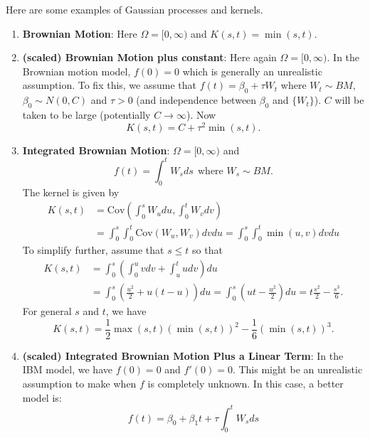 \documentclass{scrartcl}
\begin{document}
Here are some examples of Gaussian processes and kernels.
\begin{enumerate}
\item \textbf{Brownian Motion}: Here $\Omega = [0, \infty)$ and $K(s,
  t) = \min(s, t)$.
\item \textbf{(scaled) Brownian Motion plus constant}: Here again $\Omega =
  [0, \infty)$. In the Brownian motion model, $f(0) = 0$ which is
  generally an unrealistic assumption. To fix this, we assume that
  $f(t) = \beta_0 + \tau W_t$ where $W_t 
  \sim BM$, $\beta_0 \sim N(0, C)$ and $\tau > 0$ (and independence
  between   $\beta_0$ and $\{W_t\}$). $C$ will be taken to be
  large (potentially $C \rightarrow \infty$). Now  
  \begin{equation*}
    K(s, t) = C + \tau^2 \min(s, t). 
  \end{equation*}
\item \textbf{Integrated Brownian Motion}: $\Omega = [0,
  \infty)$ and
  \begin{equation*}
    f(t) = \int_0^t W_s ds ~~ \text{where $W_s \sim BM$}. 
  \end{equation*}
  The kernel is given by
  \begin{align*}
    K(s, t) &= \text{Cov} \left(\int_0^s W_u du, \int_0^t W_v dv
              \right) \\
            &= \int_0^s \int_0^t \text{Cov}(W_u, W_v) dv du 
            = \int_0^s \int_0^t \min(u, v) dv du
  \end{align*}
  To simplify further, assume that $s \leq t$ so that
  \begin{align*}
K(s, t)            &= \int_0^s \left(\int_0^u v dv + \int_u^t u dv \right) du
    \\
            &= \int_0^s \left(\frac{u^2}{2} + u(t - u) \right) du = \int_0^s \left(ut - \frac{u^2}{2} \right) du = t \frac{s^2}{2}
      - \frac{s^3}{6}. 
  \end{align*}
  For general $s$ and $t$, we have
  \begin{equation*}
    K(s, t) = \frac{1}{2} \max(s, t) \left(\min(s, t)\right)^2 -
    \frac{1}{6} \left(\min(s, t) \right)^3. 
  \end{equation*}
\item \textbf{(scaled) Integrated Brownian Motion Plus a Linear Term}:
  In the 
  IBM model, we have $f(0) = 0$ and $f'(0) = 0$. This might be
  an unrealistic assumption to make when $f$ is completely
  unknown. In this case, a better model is:
  \begin{equation*}
    f(t) = \beta_0 + \beta_1 t + \tau \int_0^t W_s ds

\end{equation*}
\end{enumerate}
\end{document}
